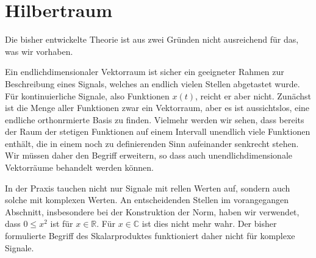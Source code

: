 %
%
%
\section{Hilbertraum
\label{section:hilbertraum}}
Die bisher entwickelte Theorie ist aus zwei Gründen nicht ausreichend für das,
was wir vorhaben.

Ein endlichdimensionaler Vektorraum ist sicher ein geeigneter Rahmen zur
Beschreibung eines Signals, welches an endlich vielen Stellen abgetastet
wurde.
Für kontinuierliche Signale, also Funktionen $x(t)$,  reicht er aber nicht.
Zunächst ist die Menge aller Funktionen zwar ein Vektorraum, aber es ist
aussichtslos, eine endliche orthonrmierte Basis zu finden.
Vielmehr werden wir sehen, dass bereits der Raum der stetigen Funktionen
auf einem Intervall unendlich viele Funktionen enthält, die in einem noch
zu definierenden Sinn aufeinander senkrecht stehen.
Wir müssen daher den Begriff erweitern, so dass auch unendlichdimensionale
Vektorräume behandelt werden können.

In der Praxis tauchen nicht nur Signale mit rellen Werten auf, sondern
auch solche mit komplexen Werten.
An entscheidenden Stellen im vorangegangen Abschnitt, insbesondere bei
der Konstruktion der Norm, haben wir verwendet,
dass $0 \le x^2$ ist für $x\in\mathbb R$. Für $x\in\mathbb C$ ist dies
nicht mehr wahr.
Der bisher formulierte Begriff des Skalarproduktes funktioniert daher
nicht für komplexe Signale.

